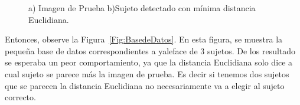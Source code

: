 \documentclass[letterpaper,12pt]{article}
\begin{document}
\begin{figure}[h]
\centering
{}
\caption{a) Imagen de Prueba b)Sujeto detectado con mínima distancia Euclidiana.}
\label{fig:2}
\end{figure} 
\vspace{1cm}
Entonces,  observe la Figura~\ref{Fig:BasedeDatos}. En esta figura, se muestra
la pequeña base de datos correspondientes a yaleface de 3 sujetos. De los resultado se esperaba un peor comportamiento, ya que la distancia Euclidiana solo  dice a cual sujeto se parece más la imagen de prueba. Es decir si tenemos dos sujetos que se parecen la distancia Euclidiana no necesariamente va a elegir al sujeto correcto.
\vspace{1cm}
\end{document}
